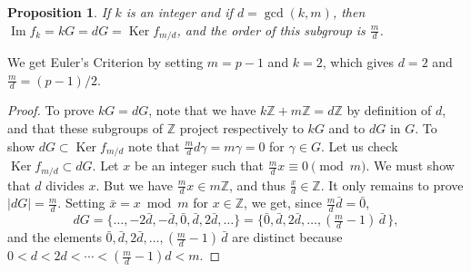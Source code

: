 \documentclass[12pt,letterpaper]{article}
\newcommand{\Z}{\mathbb Z}
\newcommand{\Ker}{\operatorname{Ker}}
\newcommand{\Ima}{\operatorname{Im}}
\newtheorem{prop}[thm]{Proposition}
\begin{document}
\begin{prop} 
If \(k\) is an integer and if \(d=\gcd(k,m)\), then \(\Ima f_k=kG=dG=\Ker f_{m/d}\), and the order of this subgroup is \(\frac md\). 
\end{prop} 

We get Euler's Criterion by setting \(m=p-1\) and \(k=2\), which gives \(d=2\) and \(\frac md=(p-1)/2\). 

\begin{proof} 
To prove \(kG=dG\), note that we have \(k\Z+m\Z=d\Z\) by definition of \(d\), and that these subgroups of \(\Z\) project respectively to \(kG\) and to \(dG\) in \(G\). To show \(dG\subset\Ker f_{m/d}\) note that \(\frac mdd\gamma=m\gamma=0\) for \(\gamma\in G\). Let us check \(\Ker f_{m/d}\subset dG\). Let \(x\) be an integer such that \(\frac mdx\equiv0\pmod{m}\). We must show that \(d\) divides \(x\). But we have \(\frac mdx\in m\Z\), and thus \(\frac xd\in\Z\). It only remains to prove \(|dG|=\frac md\). Setting \(\bar x=x\bmod m\) for \(x\in\Z\), we get, since \(\frac md\bar d=\bar0\), 
\[
dG=\{\ldots,-2\bar d,-\bar d,\bar0,\bar d,2\bar d,\ldots\}=\{\bar0,\bar d,2\bar d,\ldots,(\tfrac md-1)\,\bar d\,\},
\] 
and the elements \(\bar0,\bar d,2\bar d,\ldots,(\frac md-1)\,\bar d\) are distinct because \(0<d<2d<\cdots<(\frac md-1)d<m\).
\end{proof} 

\printbibliography
\end{document}
